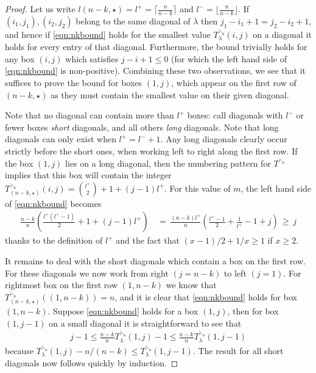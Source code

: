 \documentclass[11pt]{report}
\begin{document}
\begin{proof}	
	Let us write $l(n-k,\star) = l^{+} = \lceil \frac{n}{n-k} \rceil$ and 
	$l^{-} = \lfloor \frac{n}{n-k} \rfloor$.  	
	If $(i_{1},j_{1}), (i_{2},j_{2})$ belong to 
	the same diagonal of $\lambda$ then $j_{1} - i_{1} +1 = j_{2} - i_{2} +1$, and hence if \eqref{eqn:nkbound} holds for the smallest value $T_{\lambda}^{\searrow}(i,j)$ on a diagonal it holds for every entry of that diagonal.  Furthermore, the bound trivially holds for any box $(i,j)$ which satisfies $j-i+1 \leq0$ (for which the left hand side of \eqref{eqn:nkbound} is non-positive). 	
	Combining these two observations, we see that it suffices to prove the bound for boxes $(1,j)$, which appear on the first row of $(n-k,\star)$ as they must contain the smallest value on their given diagonal.
	
	Note that no diagonal can contain more than $l^{+}$ boxes: call diagonals with $l^{-}$ or fewer boxes \emph{short} diagonals, and all others \emph{long} diagonals. Note that long diagonals can only exist when $l^+=l^-+1$. Any long diagonals clearly occur strictly before the short ones, when working left to right along the first row. If the box $(1,j)$ lies on a long diagonal, then the numbering pattern for $T^{\searrow}$ implies that this box will contain the integer $T_{(n-k,\star)}^{\searrow}(i,j)=\binom{l^+}{2} + 1 + (j-1)l^+$. For this value of $m$, the left hand side of \eqref{eqn:nkbound} becomes
	\begin{align*}
	\frac{n-k}{n} \left( \frac{l^+(l^+-1)}{2} + 1 + (j-1)l^+ \right)\, & = \,
	\frac{(n-k)l^+}{n} \left( \frac{l^+-1}{2} + \frac{1}{l^{+}}-1 + j \right)\, \ge \, j 
	\end{align*}
	thanks to the definition of $l^+$ and the fact that $(x-1)/2 + 1/x  \geq 1$ if  $x\geq2$. 
	
	It remains to deal with the short diagonals which contain a box on the first row. For these diagonals we now work from right $(j=n-k)$ to left  $(j=1)$. For rightmost box on the first row $(1,n-k)$ we know that $T_{(n-k,\star)}^{\searrow}((1,n-k)) = n$, and it is clear that \eqref{eqn:nkbound} holds for box $(1,n-k)$. Suppose \eqref{eqn:nkbound} holds for a box $(1,j)$, then for box $(1,j-1)$ on a small diagonal it is straightforward to see that
	\begin{eqnarray}
	j-1 \leq  \frac{n-k}{n}T_{\lambda}^{\searrow}(1,j) -1  \leq \frac{n-k}{n} T_{\lambda}^{\searrow}(1,j-1)
	\end{eqnarray}
	because $T_{\lambda}^{\searrow}(1,j) - n/(n-k)  \leq T_{\lambda}^{\searrow}(1,j-1)$.	The result for all short diagonals now follows quickly by induction.	
\end{proof}
\end{document}
